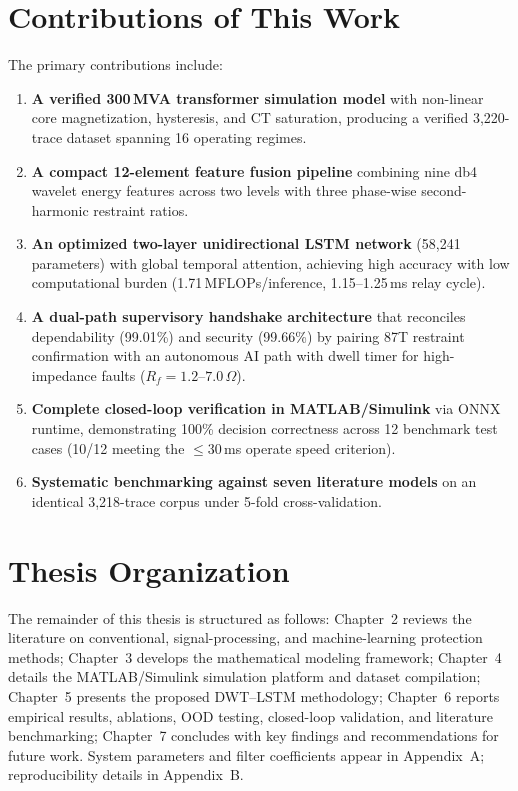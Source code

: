 \documentclass[12pt,a4paper,oneside]{report}
\begin{document}
\section{Contributions of This Work}
The primary contributions include:
\begin{enumerate}[leftmargin=1.6em,itemsep=2pt]
\item \textbf{A verified 300\,MVA transformer simulation model} with non-linear core magnetization, hysteresis, and CT saturation, producing a verified 3{,}220-trace dataset spanning 16 operating regimes.
\item \textbf{A compact 12-element feature fusion pipeline} combining nine db4 wavelet energy features across two levels with three phase-wise second-harmonic restraint ratios.
\item \textbf{An optimized two-layer unidirectional LSTM network} (58{,}241 parameters) with global temporal attention, achieving high accuracy with low computational burden (1.71\,MFLOPs/inference, 1.15--1.25\,ms relay cycle).
\item \textbf{A dual-path supervisory handshake architecture} that reconciles dependability (99.01\%) and security (99.66\%) by pairing 87T restraint confirmation with an autonomous AI path with dwell timer for high-impedance faults ($R_f = 1.2$--$7.0\,\Omega$).
\item \textbf{Complete closed-loop verification in MATLAB/Simulink} via ONNX runtime, demonstrating 100\% decision correctness across 12 benchmark test cases (10/12 meeting the $\le 30$\,ms operate speed criterion).
\item \textbf{Systematic benchmarking against seven literature models} on an identical 3{,}218-trace corpus under 5-fold cross-validation.
\end{enumerate}

\section{Thesis Organization}
The remainder of this thesis is structured as follows: Chapter~2 reviews the literature on conventional, signal-processing, and machine-learning protection methods; Chapter~3 develops the mathematical modeling framework; Chapter~4 details the MATLAB/Simulink simulation platform and dataset compilation; Chapter~5 presents the proposed DWT--LSTM methodology; Chapter~6 reports empirical results, ablations, OOD testing, closed-loop validation, and literature benchmarking; Chapter~7 concludes with key findings and recommendations for future work. System parameters and filter coefficients appear in Appendix~A; reproducibility details in Appendix~B.
\end{document}
